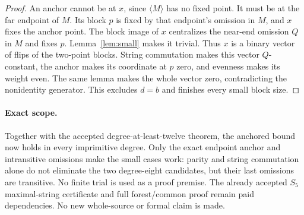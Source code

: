 \documentclass[11pt,a4paper]{article}
\newcommand{\gen}[1]{\langle#1\rangle}
\begin{document}
\begin{proof}
An anchor cannot be at $x$, since $\gen M$ has no fixed
point. It must be at the far endpoint of $M$. Its block $p$
is fixed by that endpoint's omission in $M$, and $x$ fixes
the anchor point. The block image of $x$ centralizes the
near-end omission $Q$ in $M$ and fixes $p$. Lemma~\ref{lem:small}
makes it trivial. Thus $x$ is a binary vector of flips of the
two-point blocks. String commutation makes this vector
$Q$-constant, the anchor makes its coordinate at $p$ zero,
and evenness makes its weight even. The same lemma makes
the whole vector zero, contradicting the nonidentity generator.
This excludes $d=b$ and finishes every small block size.
\end{proof}

\paragraph{Exact scope.}
Together with the accepted degree-at-least-twelve theorem,
the anchored bound now holds in every imprimitive degree.
Only the exact endpoint anchor and intransitive omissions make
the small cases work: parity and string commutation alone do not
eliminate the two degree-eight candidates, but their last
omissions are transitive.
No finite trial is used as a proof premise. The already accepted
$S_5$ maximal-string certificate and full forest/common proof
remain paid dependencies. No new whole-source or formal claim
is made.
\end{document}
